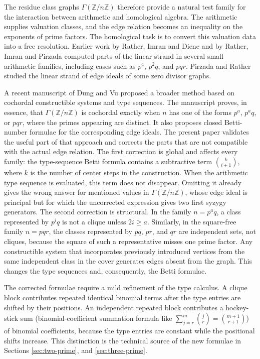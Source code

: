 \documentclass[12pt]{article}
\theoremstyle{definition}
\begin{document}
\medskip

The residue class graphs $\Gamma(\mathbb{Z}/n\mathbb{Z})$ therefore provide a natural test family for the interaction between arithmetic and homological algebra.  The arithmetic supplies valuation classes, and the edge relation becomes an inequality on the exponents of prime factors.  The homological task is to convert this valuation data into a free resolution.  Earlier work by Rather, Imran and Diene \cite{RatherImranDiene2024} and by Rather, Imran and Pirzada \cite{RatherImranPirzada2024} computed parts of the linear strand in several small arithmetic families, including cases such as $p^4$, $p^2q$, and $pqr$. Pirzada and Rather \cite{PirzadaRather} studied  the linear strand of edge ideals of some zero divisor graphs.

\medskip

A recent manuscript of Dung and Vu \cite{DungVu2026} proposed a broader method based on cochordal constructible systems and type sequences.  The manuscript proves, in essence, that $\Gamma(\mathbb{Z}/n\mathbb{Z})$ is cochordal exactly when $n$ has one of the forms $p^a$, $p^a q$, or $pqr$, where the primes appearing are distinct.  It also proposes closed Betti-number formulae for the corresponding edge ideals. The present paper validates the useful part of that approach and corrects the parts that are not compatible with the actual edge relation.  The first correction is global and affects every family: the type-sequence Betti formula contains a subtractive term $\binom{k}{i+1}$, where $k$ is the number of center steps in the construction.  When the arithmetic type sequence is evaluated, this term does not disappear.  Omitting it already gives the wrong answer for mentioned values in $\Gamma(\mathbb{Z}/n\mathbb{Z})$, whose edge ideal is principal but for which the uncorrected expression gives two first syzygy generators.
 The second correction is structural.  In the family $n=p^a q$, a class represented by $p^i q$ is not a clique unless $2i\geq a$.  Similarly, in the square-free family $n=pqr$, the classes represented by $pq$, $pr$, and $qr$ are independent sets, not cliques, because the square of such a representative misses one prime factor.  Any constructible system that incorporates previously introduced vertices from the same independent class in the cover generates edges absent from the graph.  This changes the type sequences and, consequently, the Betti formulae.

\medskip

The corrected formulae require a mild refinement of the type calculus.  A clique block contributes repeated identical binomial terms after the type entries are shifted by their positions.  An independent repeated block contributes a hockey-stick sum (binomial-coefficient summation formula like $
\sum_{j=r}^{m} \binom{j}{r}=\binom{m+1}{r+1}$) of binomial coefficients, because the type entries are constant while the positional shifts increase.  This distinction is the technical source of the new formulae in Sections \ref{sec:two-prime}, and \ref{sec:three-prime}.
\end{document}
